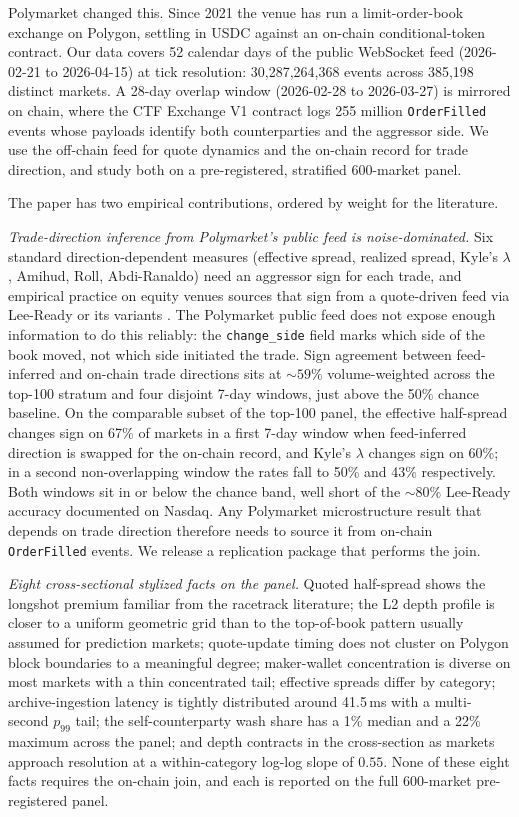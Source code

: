 Polymarket changed this. Since 2021 the venue has run a
limit-order-book exchange on Polygon, settling in USDC against an
on-chain conditional-token contract. Our data covers 52 calendar days
of the public WebSocket feed (2026-02-21 to 2026-04-15) at tick
resolution: 30,287,264,368 events across 385,198 distinct markets.
A 28-day overlap window (2026-02-28 to 2026-03-27) is mirrored on
chain, where the CTF Exchange V1 contract logs 255 million
\texttt{OrderFilled} events whose payloads identify both
counterparties and the aggressor side. We use the off-chain feed for
quote dynamics and the on-chain record for trade direction, and study
both on a pre-registered, stratified 600-market panel.

The paper has two empirical contributions, ordered by weight for the
literature.

\textit{Trade-direction inference from Polymarket's public feed is
noise-dominated.} Six standard direction-dependent measures
(effective spread, realized spread, Kyle's $\lambda$, Amihud, Roll,
Abdi-Ranaldo) need an aggressor sign for each trade, and empirical
practice on equity venues sources that sign from a quote-driven feed
via Lee-Ready or its variants
\citep{lee-ready-1991,ellis-michaely-ohara-2000}. The Polymarket
public feed does not expose enough information to do this reliably:
the \texttt{change\_side} field marks which side of the book moved,
not which side initiated the trade. Sign agreement between
feed-inferred and on-chain trade directions sits at $\sim 59\%$
volume-weighted across the top-100 stratum and four disjoint 7-day
windows, just above the 50\% chance baseline. On the comparable
subset of the top-100 panel, the effective half-spread changes sign
on 67\% of markets in a first 7-day window when feed-inferred
direction is swapped for the on-chain record, and Kyle's $\lambda$
changes sign on 60\%; in a second non-overlapping window the rates
fall to 50\% and 43\% respectively. Both windows sit in or below
the chance band, well short of the $\sim 80\%$ Lee-Ready accuracy
documented on Nasdaq. Any Polymarket microstructure result that
depends on trade direction therefore needs to source it from
on-chain \texttt{OrderFilled} events. We release a replication
package that performs the join.

\textit{Eight cross-sectional stylized facts on the panel.} Quoted
half-spread shows the longshot premium familiar from the racetrack
literature; the L2 depth profile is closer to a uniform geometric
grid than to the top-of-book pattern usually assumed for prediction
markets; quote-update timing does not cluster on Polygon block
boundaries to a meaningful degree; maker-wallet concentration is
diverse on most markets with a thin concentrated tail; effective
spreads differ by category; archive-ingestion latency is tightly
distributed around 41.5\,ms with a multi-second $p_{99}$ tail; the
self-counterparty wash share has a 1\% median and a 22\% maximum
across the panel; and depth contracts in the cross-section as
markets approach resolution at a within-category log-log slope of
$0.55$. None of these eight facts requires the on-chain join, and
each is reported on the full 600-market pre-registered panel.

